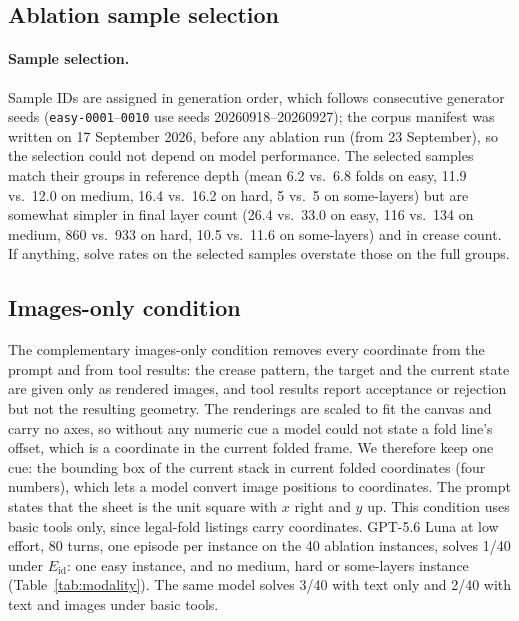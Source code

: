 \subsection{Ablation sample selection}
\label{app:sample-selection}
\paragraph{Sample selection.} Sample IDs are assigned in generation order, which follows
consecutive generator seeds (\texttt{easy-0001}--\texttt{0010} use seeds 20260918--20260927); the
corpus manifest was written on 17 September 2026, before any ablation run (from 23 September), so
the selection could not depend on model performance. The selected samples match their groups in
reference depth (mean 6.2 vs.\ 6.8 folds on easy, 11.9 vs.\ 12.0 on medium, 16.4 vs.\ 16.2 on hard,
5 vs.\ 5 on some-layers) but are somewhat simpler in final layer count (26.4 vs.\ 33.0 on easy,
116 vs.\ 134 on medium, 860 vs.\ 933 on hard, 10.5 vs.\ 11.6 on some-layers) and in crease count.
If anything, solve rates on the selected samples overstate those on the full groups.


\subsection{Images-only condition}
\label{app:images-only}
The complementary images-only condition removes every coordinate from the prompt and from tool
results: the crease pattern, the target and the current state are given only as rendered images,
and tool results report acceptance or rejection but not the resulting geometry. The renderings are
scaled to fit the canvas and carry no axes, so without any numeric cue a model could not state a
fold line's offset, which is a coordinate in the current folded frame. We therefore keep one cue:
the bounding box of the current stack in current folded coordinates (four numbers), which lets a
model convert image positions to coordinates. The prompt states that the sheet is the unit square
with $x$ right and $y$ up. This condition uses basic tools only, since legal-fold listings carry
coordinates. GPT-5.6 Luna at low effort, 80 turns, one episode per instance on the 40 ablation
instances, solves 1/40 under $E_{\mathrm{id}}$: one easy instance, and no medium, hard or some-layers
instance (Table~\ref{tab:modality}). The same model solves 3/40 with text only and 2/40 with text and
images under basic tools.

